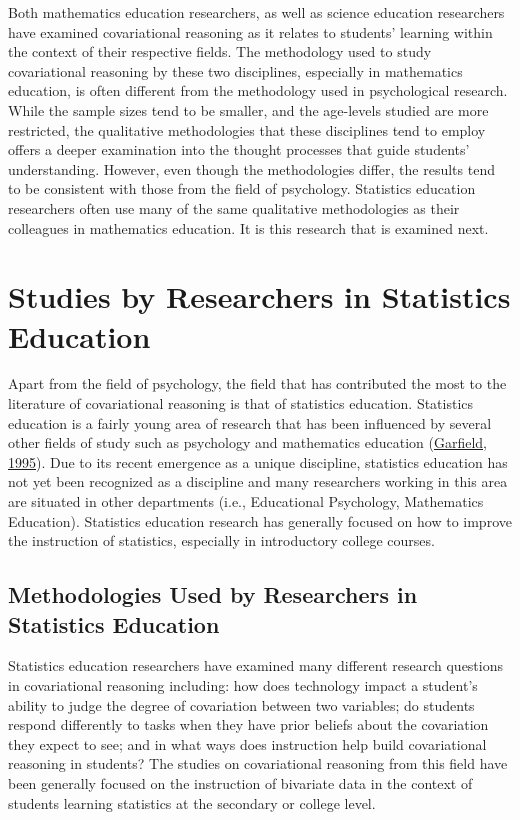 \documentclass[11pt]{umnthesis}
\begin{document}
Both mathematics education researchers, as well as science education researchers have examined covariational reasoning as it relates to students' learning within the context of their respective fields. The methodology used to study covariational reasoning by these two disciplines, especially in mathematics education, is often different from the methodology used in psychological research. While the sample sizes tend to be smaller, and the age-levels studied are more restricted, the qualitative methodologies that these disciplines tend to employ offers a deeper examination into the thought processes that guide students' understanding. However, even though the methodologies differ, the results tend to be consistent with those from the field of psychology. Statistics education researchers often use many of the same qualitative methodologies as their colleagues in mathematics education. It is this research that is examined next.

\hypertarget{studies-by-researchers-in-statistics-education}{%
\section{Studies by Researchers in Statistics Education}\label{studies-by-researchers-in-statistics-education}}

Apart from the field of psychology, the field that has contributed the most to the literature of covariational reasoning is that of statistics education. Statistics education is a fairly young area of research that has been influenced by several other fields of study such as psychology and mathematics education (\protect\hyperlink{ref-garfield:1995}{Garfield, 1995}). Due to its recent emergence as a unique discipline, statistics education has not yet been recognized as a discipline and many researchers working in this area are situated in other departments (i.e., Educational Psychology, Mathematics Education). Statistics education research has generally focused on how to improve the instruction of statistics, especially in introductory college courses.

\hypertarget{methodologies-used-by-researchers-in-statistics-education}{%
\subsection{Methodologies Used by Researchers in Statistics Education}\label{methodologies-used-by-researchers-in-statistics-education}}

Statistics education researchers have examined many different research questions in covariational reasoning including: how does technology impact a student's ability to judge the degree of covariation between two variables; do students respond differently to tasks when they have prior beliefs about the covariation they expect to see; and in what ways does instruction help build covariational reasoning in students? The studies on covariational reasoning from this field have been generally focused on the instruction of bivariate data in the context of students learning statistics at the secondary or college level.
\end{document}
